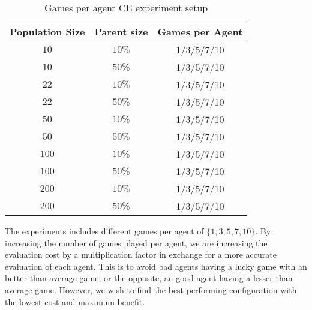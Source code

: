 \begin{table}[H]
\centering
\begin{tabular}{c c c}
Population Size & Parent size & Games per Agent\\
\hline
$10$ & $10\%$ & 1/3/5/7/10\\
$10$ & $50\%$ & 1/3/5/7/10\\
$22$ & $10\%$ & 1/3/5/7/10\\
$22$ & $50\%$ & 1/3/5/7/10\\
$50$ & $10\%$ & 1/3/5/7/10\\
$50$ & $50\%$ & 1/3/5/7/10\\
$100$ & $10\%$  & 1/3/5/7/10\\
$100$ & $50\%$ & 1/3/5/7/10\\
$200$ & $10\%$ & 1/3/5/7/10\\
$200$ & $50\%$ & 1/3/5/7/10
\end{tabular}
\caption{Games per agent CE experiment setup\label{GamesPerAgentCE}}
\end{table}

The experiments includes different games per agent of $\{1,3,5,7,10\}$. By increasing the number of games 
played per agent, we are increasing the evaluation cost by a multiplication factor in exchange for a more 
accurate evaluation of each agent. This is to avoid bad agents having a lucky game with an better than 
average game, or the opposite, an good agent having a lesser than average game. However, we wish to find 
the best performing configuration with the lowest cost and maximum benefit.

\\
